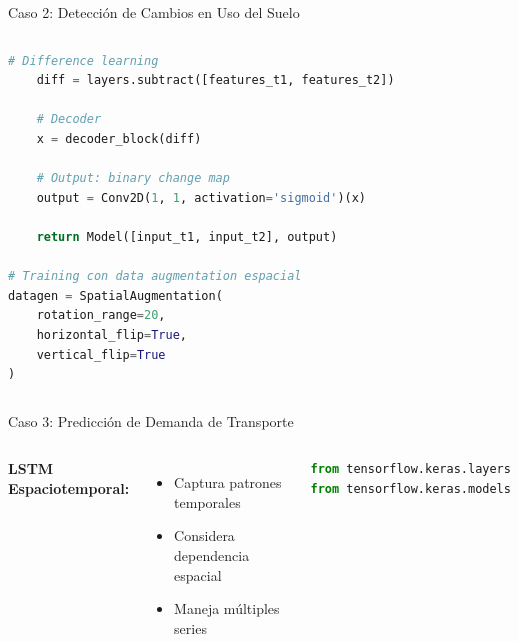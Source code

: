 \documentclass[10pt,aspectratio=169]{beamer}
\begin{document}
\begin{frame}{Caso 2: Detección de Cambios en Uso del Suelo}
\begin{columns}
\begin{lstlisting}[language=Python,basicstyle=\tiny]
    # Difference learning
    diff = layers.subtract([features_t1, features_t2])

    # Decoder
    x = decoder_block(diff)

    # Output: binary change map
    output = Conv2D(1, 1, activation='sigmoid')(x)

    return Model([input_t1, input_t2], output)

# Training con data augmentation espacial
datagen = SpatialAugmentation(
    rotation_range=20,
    horizontal_flip=True,
    vertical_flip=True
)
        \end{lstlisting}
    \end{columns}
\end{frame}

\begin{frame}{Caso 3: Predicción de Demanda de Transporte}
    \begin{columns}
        \textbf{LSTM Espaciotemporal:}
        \begin{itemize}
            \item Captura patrones temporales
            \item Considera dependencia espacial
            \item Maneja múltiples series
        \end{itemize}

        \vspace{3mm}

        \begin{lstlisting}[language=Python,basicstyle=\tiny]
from tensorflow.keras.layers import LSTM, Dense
from tensorflow.keras.models import Sequential


\end{lstlisting}
\end{columns}
\end{frame}
\end{document}
